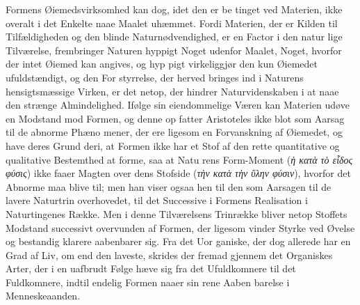\documentclass[12pt,a4paper]{book}
\newcommand{\gk}[1]{\textit{#1}}
\begin{document}
Formens Øiemedsvirksomhed kan dog, idet den er be\-%
tinget ved Materien, ikke overalt i det Enkelte naae Maalet
uhæmmet. Fordi Materien, der er Kilden til Tilfældigheden
og den blinde Naturnødvendighed, er en Factor i den natur\-%
lige Tilværelse, frembringer Naturen hyppigt Noget udenfor
Maalet, Noget, hvorfor der intet Øiemed kan angives, og hyp\-%
pigt virkeliggjør den kun Øiemedet ufuldstændigt, og den For\-%
styrrelse, der herved bringes ind i Naturens hensigtsmæssige
Virken, er det netop, der hindrer Naturvidenskaben i at naae
den strænge Almindelighed. Ifølge sin eiendommelige Væren
kan Materien udøve en Modstand mod Formen, og denne op\-%
fatter Aristoteles ikke blot som Aarsag til de abnorme Phæno\-%
mener, der ere ligesom en Forvanskning af Øiemedet, og have
deres Grund deri, at Formen ikke har et Stof af den rette
quantitative og qualitative Bestemthed at forme, saa at Natu\-%
rens Form-Moment (\gk{ἡ κατὰ τὸ εἶδος φύσις}) ikke faaer Magten
over dens Stofside (\gk{τὴν κατὰ τὴν ὕλην φύσιν}), hvorfor det
Abnorme maa blive til; men han viser ogsaa hen til den
som Aarsagen til de lavere Naturtrin overhovedet, til det
Successive i Formens Realisation i Naturtingenes Række. Men
i denne Tilværelsens Trinrække bliver netop Stoffets Modstand
successivt overvunden af Formen, der ligesom vinder Styrke
ved Øvelse og bestandig klarere aabenbarer sig. Fra det Uor\-%
ganiske, der dog allerede har en Grad af Liv, om end den
laveste, skrides der fremad gjennem det Organiskes Arter, der
i en uafbrudt Følge hæve sig fra det Ufuldkomnere til det
Fuldkomnere, indtil endelig Formen naaer sin rene Aaben\-%
barelse i Menneskeaanden.
\end{document}
